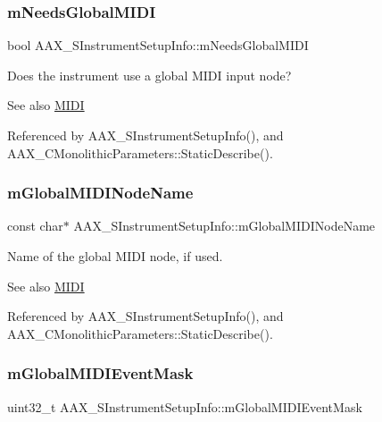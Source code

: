 \subsubsection{\texorpdfstring{mNeedsGlobalMIDI}{mNeedsGlobalMIDI}}
{\footnotesize\ttfamily bool A\+A\+X\+\_\+\+S\+Instrument\+Setup\+Info\+::m\+Needs\+Global\+M\+I\+DI}



Does the instrument use a global M\+I\+DI input node? 

\begin{DoxySeeAlso}{See also}
\mbox{\hyperlink{a00806}{M\+I\+DI}} 
\end{DoxySeeAlso}


Referenced by A\+A\+X\+\_\+\+S\+Instrument\+Setup\+Info(), and A\+A\+X\+\_\+\+C\+Monolithic\+Parameters\+::\+Static\+Describe().

\mbox{\label{a01957_ae281e987dc73d0ff5d6ccbceb3383da9}} 
\subsubsection{\texorpdfstring{mGlobalMIDINodeName}{mGlobalMIDINodeName}}
{\footnotesize\ttfamily const char$\ast$ A\+A\+X\+\_\+\+S\+Instrument\+Setup\+Info\+::m\+Global\+M\+I\+D\+I\+Node\+Name}



Name of the global M\+I\+DI node, if used. 

\begin{DoxySeeAlso}{See also}
\mbox{\hyperlink{a00806}{M\+I\+DI}} 
\end{DoxySeeAlso}


Referenced by A\+A\+X\+\_\+\+S\+Instrument\+Setup\+Info(), and A\+A\+X\+\_\+\+C\+Monolithic\+Parameters\+::\+Static\+Describe().

\mbox{\label{a01957_a3b64c64e7b90cb189eb24e5417d9d88b}} 
\subsubsection{\texorpdfstring{mGlobalMIDIEventMask}{mGlobalMIDIEventMask}}
{\footnotesize\ttfamily uint32\+\_\+t A\+A\+X\+\_\+\+S\+Instrument\+Setup\+Info\+::m\+Global\+M\+I\+D\+I\+Event\+Mask}



